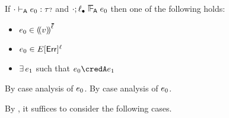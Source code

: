 \begin{lemma}\label{A-label-progress}
  If\/ ${\cdot} \vdash_{\mathsf{A}} e_0 : {\tau{\scriptstyle ?}}$
  and\/ $\snil; \ownertop \sWLA \sexpr_0$
  then one of the following holds:
  \begin{itemize}
    \item
      $\sexpr_0 \in \obbars{\svalue}{\sownerlist}$
    \item
      $e_0 \in E[\mathsf{Err}]^{\ell}$
    \item
      $\exists\,e_1$
      such that\/ $\sexpr_0 \credA \sexpr_1$
  \end{itemize}
\end{lemma}{
  \newcommand{\shortpf}{By case analysis of $\sexpr_0$.}
\begin{lamportproof*}
  \shortpf
\mainproof
  \shortpf

  By , it suffices to consider the following cases.

    \begin{pfproof}
      \qedstep
    \end{pfproof}

    \begin{pfproof}
      \qedstep
    \end{pfproof}


\end{lamportproof*}}
